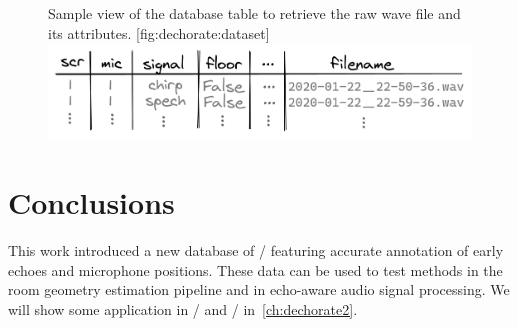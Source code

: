 \begin{figure}
    \begin{sidecaption}[]{
            Sample view of the database table to retrieve the raw wave file and its attributes.
        }[fig:dechorate:dataset]
        \centering
        \includegraphics[width=\linewidth]{figures/dechorate/database.png}
    \end{sidecaption}
\end{figure}

\section{Conclusions}
This work introduced a new database of \RIRdef/ featuring accurate annotation of early echoes and microphone positions.
These data can be used to test methods in the room geometry estimation pipeline and in echo-aware audio signal processing.
We will show some application in \SE/ and \RooGE/ in~\cref{ch:dechorate2}.